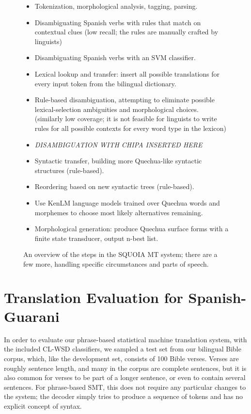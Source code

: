 \begin{figure}
  \begin{itemize}
  \item Tokenization, morphological analysis, tagging, parsing.
  \item Disambiguating Spanish verbs with rules that match on contextual clues
  (low recall; the rules are manually crafted by linguists)
  \item Disambiguating Spanish verbs with an SVM classifier.
  \item Lexical lookup and transfer: insert all possible translations for every
  input token from the bilingual dictionary.
  \item Rule-based disambiguation, attempting to eliminate possible
  lexical-selection ambiguities and morphological choices. (similarly low
  coverage; it is not feasible for linguists to write rules for all possible
  contexts for every word type in the lexicon)
  \item \emph{DISAMBIGUATION WITH CHIPA INSERTED HERE}
  \item Syntactic transfer, building more Quechua-like syntactic structures
  (rule-based).
  \item Reordering based on new syntactic trees (rule-based).
  \item Use KenLM language models trained over Quechua words and morphemes to
  choose most likely alternatives remaining.
  \item Morphological generation: produce Quechua surface forms with a finite
  state transducer, output n-best list.
  \end{itemize}

  \caption{An overview of the steps in the SQUOIA MT system; there are a few
  more, handling specific circumstances and parts of speech.}
  \label{fig:squoia-steps}
\end{figure}


\section{Translation Evaluation for Spanish-Guarani}

In order to evaluate our phrase-based statistical machine translation system,
with the included CL-WSD classifiers, we sampled a test set from our bilingual
Bible corpus, which, like the development set, consists of 100 Bible verses.
Verses are roughly sentence length, and many in the corpus are complete
sentences, but it is also common for verses to be part of a longer sentence, or
even to contain several sentences. For phrase-based SMT, this does not require
any particular changes to the system; the decoder simply tries to produce a
sequence of tokens and has no explicit concept of syntax.

